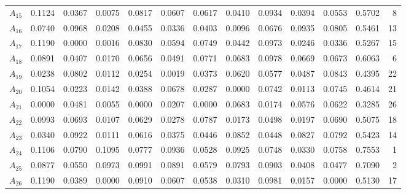 \documentclass[5p,times]{elsarticle}
\begin{document}
\begin{table}[ht!]
{\begin{tabular}{lrrrrrrrrrrrr}
$A_{15}$ & 0.1124 & 0.0367 & 0.0075 & 0.0817 & 0.0607 & 0.0617 & 0.0410 & 0.0934 & 0.0394 & 0.0553 & 0.5702 & 8 \\
$A_{16}$ & 0.0740 & 0.0968 & 0.0208 & 0.0455 & 0.0336 & 0.0403 & 0.0096 & 0.0676 & 0.0935 & 0.0805 & 0.5461 & 13 \\
$A_{17}$ & 0.1190 & 0.0000 & 0.0016 & 0.0830 & 0.0594 & 0.0749 & 0.0442 & 0.0973 & 0.0246 & 0.0336 & 0.5267 & 15 \\
$A_{18}$ & 0.0891 & 0.0407 & 0.0170 & 0.0656 & 0.0491 & 0.0771 & 0.0683 & 0.0978 & 0.0669 & 0.0673 & 0.6063 & 6 \\
$A_{19}$ & 0.0238 & 0.0802 & 0.0112 & 0.0254 & 0.0019 & 0.0373 & 0.0620 & 0.0577 & 0.0487 & 0.0843 & 0.4395 & 22 \\
$A_{20}$ & 0.1054 & 0.0223 & 0.0142 & 0.0388 & 0.0678 & 0.0287 & 0.0000 & 0.0742 & 0.0113 & 0.0745 & 0.4614 & 21 \\
$A_{21}$ & 0.0000 & 0.0481 & 0.0055 & 0.0000 & 0.0207 & 0.0000 & 0.0683 & 0.0174 & 0.0576 & 0.0622 & 0.3285 & 26 \\
$A_{22}$ & 0.0993 & 0.0693 & 0.0107 & 0.0629 & 0.0278 & 0.0787 & 0.0173 & 0.0498 & 0.0197 & 0.0690 & 0.5075 & 18 \\
$A_{23}$ & 0.0340 & 0.0922 & 0.0111 & 0.0616 & 0.0375 & 0.0446 & 0.0852 & 0.0448 & 0.0827 & 0.0792 & 0.5423 & 14 \\
$A_{24}$ & 0.1106 & 0.0790 & 0.1095 & 0.0777 & 0.0936 & 0.0528 & 0.0925 & 0.0748 & 0.0330 & 0.0758 & 0.7553 & 1 \\
$A_{25}$ & 0.0877 & 0.0550 & 0.0973 & 0.0991 & 0.0891 & 0.0579 & 0.0793 & 0.0903 & 0.0408 & 0.0477 & 0.7090 & 2 \\
$A_{26}$ & 0.1190 & 0.0389 & 0.0000 & 0.0910 & 0.0607 & 0.0538 & 0.0310 & 0.0981 & 0.0157 & 0.0000 & 0.5130 & 17 \\ \bottomrule
\end{tabular}
}
\end{table}
%
\end{document}
